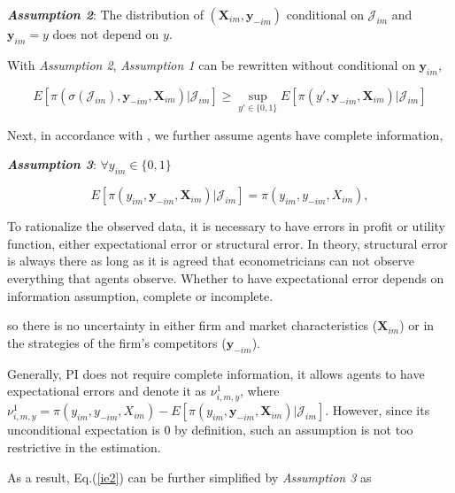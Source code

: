 \documentclass[draft]{article}
\begin{document}
\bigskip

\textbf{\textit{Assumption 2}}: The distribution of $(\textbf{X}_{im},\textbf{y}_{-im})$ conditional on $\mathcal{J}_{im}$ and $\textbf{y}_{im}=y$ does not depend on $y$.

\bigskip

With \textit{Assumption 2}, \textit{Assumption 1} can be rewritten without conditional on $\textbf{y}_{im}$,

\begin{equation}
E[\pi(\sigma(\mathcal{J}_{im}),\textbf{y}_{-im},\textbf{X}_{im})|\mathcal{J}_{im}]\geq \sup_{y'\in \{0,1\}} E[\pi(y',\textbf{y}_{-im},\textbf{X}_{im})|\mathcal{J}_{im}]
\label{ie2}
\end{equation}
 
Next, in accordance with \cite{ciliberto2009market}, we further assume agents have complete information,

\bigskip

\textbf{\textit{Assumption 3}}: $\forall y_{im} \in \{0,1\}$

$$E[\pi(y_{im},\textbf{y}_{-im},\textbf{X}_{im})|\mathcal{J}_{im}]=\pi(y_{im},y_{-im},X_{im}),$$


\bigskip

{\color{DarkOliveGreen}

To rationalize the observed data, it is necessary to have errors in profit or utility function, either expectational error or structural error. In theory, structural error is always there as long as it is agreed that econometricians can not observe everything that agents observe. Whether to have expectational error depends on information assumption, complete or incomplete. 

}

\bigskip

so there is no uncertainty in either firm and market characteristics ($\textbf{X}_{im}$) or in the strategies of the firm's competitors ($\textbf{y}_{-im}$). 

Generally, PI does not require complete information, it allows agents to have expectational errors and denote it as $\nu^1_{i,m,y}$, where $\nu^1_{i,m,y}=\pi(y_{im},y_{-im},X_{im})-E[\pi(y_{im},\textbf{y}_{-im},\textbf{X}_{im})|\mathcal{J}_{im}]$. However, since its unconditional expectation is 0 by definition, such an assumption is not too restrictive in the estimation. 


As a result, Eq.(\ref{ie2}) can be further simplified by \textit{Assumption 3} as 
\end{document}
